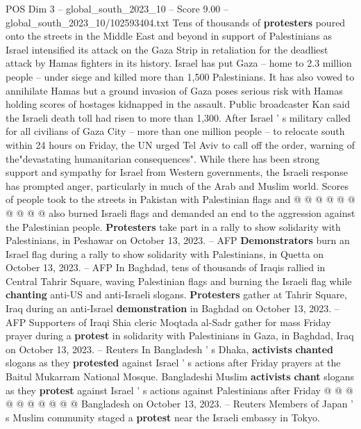 \begin{textsample}{POS Dim 3 – global\_south\_2023\_10 – Score 9.00 – global\_south\_2023\_10/102593404.txt}  \label{ex:f3_pos_436}
Tens of thousands of \textbf{protesters} poured onto the streets in the Middle East and beyond in support of Palestinians as Israel intensified its attack on the Gaza Strip in retaliation for the deadliest attack by Hamas fighters in its history.
Israel has put Gaza -- home to 2.3 million people -- under siege and killed more than 1,500 Palestinians.
It has also vowed to annihilate Hamas but a ground invasion of Gaza poses serious risk with Hamas holding scores of hostages kidnapped in the assault.
Public broadcaster Kan said the Israeli death toll had risen to more than 1,300.
After Israel ' s military called for all civilians of Gaza City -- more than one million people -- to relocate south within 24 hours on Friday, the UN urged Tel Aviv to call off the order, warning of the"devastating humanitarian consequences".
While there has been strong support and sympathy for Israel from Western governments, the Israeli response has prompted anger, particularly in much of the Arab and Muslim world.
Scores of people took to the streets in Pakistan with Palestinian flags and @ @ @ @ @ @ @ @ @ @ also burned Israeli flags and demanded an end to the aggression against the Palestinian people. \textbf{Protesters} take part in a rally to show solidarity with Palestinians, in Peshawar on October 13, 2023. -- AFP \textbf{Demonstrators} burn an Israel flag during a rally to show solidarity with Palestinians, in Quetta on October 13, 2023. -- AFP In Baghdad, tens of thousands of Iraqis rallied in Central Tahrir Square, waving Palestinian flags and burning the Israeli flag while \textbf{chanting} anti-US and anti-Israeli slogans. \textbf{Protesters} gather at Tahrir Square, Iraq during an anti-Israel \textbf{demonstration} in Baghdad on October 13, 2023. -- AFP Supporters of Iraqi Shia cleric Moqtada al-Sadr gather for mass Friday prayer during a \textbf{protest} in solidarity with Palestinians in Gaza, in Baghdad, Iraq on October 13, 2023. -- Reuters In Bangladesh ' s Dhaka, \textbf{activists} \textbf{chanted} slogans as they \textbf{protested} against Israel ' s actions after Friday prayers at the Baitul Mukarram National Mosque.
Bangladeshi Muslim \textbf{activists} \textbf{chant} slogans as they \textbf{protest} against Israel ' s actions against Palestinians after Friday @ @ @ @ @ @ @ @ @ @ Bangladesh on October 13, 2023. -- Reuters Members of Japan ' s Muslim community staged a \textbf{protest} near the Israeli embassy in Tokyo.

\end{textsample}
